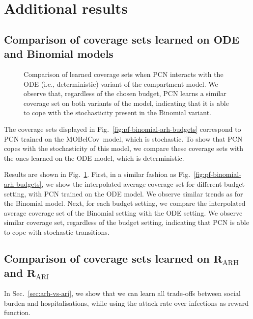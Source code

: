 \documentclass{article}
\newcommand{\momdpname}{MOBelCov}
\begin{document}

\section{Additional results}

\subsection{Comparison of coverage sets learned on ODE and Binomial models}
\label{sec:cs-ode-vs-binomial}

\begin{figure}[t!]
    \centering
    
    \caption{Comparison of learned coverage sets when PCN interacts with the ODE (i.e., deterministic) variant of the compartment model. We observe that, regardless of the chosen budget, PCN learns a similar coverage set on both variants of the model, indicating that it is able to cope with the stochasticity present in the Binomial variant.}
    \label{fig:pf-binomial-ode}
\end{figure}

The coverage sets displayed in Fig.~\ref{fig:pf-binomial-arh-budgets} correspond to PCN trained on the \momdpname\ model, which is stochastic. To show that PCN copes with the stochasticity of this model, we compare these coverage sets with the ones learned on the ODE model, which is deterministic.

Results are shown in Fig.~\ref{fig:pf-binomial-ode}. First, in a similar fashion as Fig.~\ref{fig:pf-binomial-arh-budgets}, we show the interpolated average coverage set for different budget setting, with PCN trained on the ODE model. We observe similar trends as for the Binomial model. Next, for each budget setting, we compare the interpolated average coverage set of the Binomial setting with the ODE setting. We observe similar coverage set, regardless of the budget setting, indicating that PCN is able to cope with stochastic transitions.

\subsection{Comparison of coverage sets learned on $\mathbf{R}_{\text{ARH}}$ and $\mathbf{R}_{\text{ARI}}$}
\label{sec:cs-arh-vs-ari}

In Sec.~\ref{sec:arh-vs-ari}, we show that we can learn all trade-offs between social burden and hospitalisations, while using the attack rate over infections as reward function.
\end{document}
